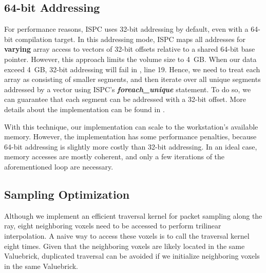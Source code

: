 \subsection{64-bit Addressing} 
For performance reasons, ISPC uses 32-bit addressing by default, even with
a 64-bit compilation target. In this addressing mode, ISPC maps all addresses for
\textbf{varying} array access to vectors of 32-bit offsets relative to a shared
64-bit base pointer. However, this approach limits the volume size to 4~GB.
When our data exceed 4~GB, 32-bit addressing will fail in ,
line 19. Hence, we need to treat each array as consisting of smaller
segments, and then iterate over all unique segments addressed by a vector using
ISPC's \textbf{\textit{foreach\_unique}} statement. To do so, we can guarantee 
that each segment can be addressed with a 32-bit offset. More details about
the implementation can be found in \cite{wald_2018}. 

With this technique, our implementation can scale to the workstation's available
memory. However, the implementation has some performance penalties, because 64-bit addressing is slightly more costly than 32-bit addressing. In an ideal case, memory accesses are mostly coherent, and only a few iterations of the aforementioned loop are necessary.


\subsection{Sampling Optimization}
Although we implement an efficient traversal kernel for packet sampling along the ray,
eight neighboring voxels need to be accessed to perform trilinear interpolation.
A naive way to access these voxels is to call the traversal kernel eight
times. Given that the neighboring voxels are likely located in the same Valuebrick,
duplicated traversal can be avoided if we initialize neighboring voxels in the same
Valuebrick. 

